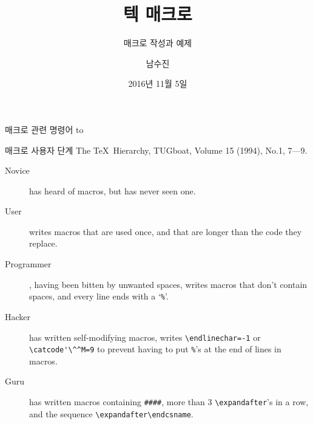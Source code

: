 \documentclass{beamer}
\title{텍 매크로}
\subtitle{매크로 작성과 예제}
\author{남수진}
\date{2016년 11월 5일}
\institute{
  2016 공주대학교 문서작성 워크숍 2016\\
  공주대학교 인문사회과학관 1층 컴퓨터실 107호}
\begin{document}
\maketitle



 
%
\begin{frame}{매크로 관련 명령어}
  \vspace{4mm}
  \hbox to
\end{frame}


%
\begin{frame}[fragile]{매크로 사용자 단계}
  The \TeX\ Hierarchy, TUGboat, Volume 15 (1994), No.1, 7---9.
  \begin{description}
  \item [Novice] has heard of macros, but has never seen one.
  \item [User] writes macros that are used once, and that are
    longer than the code they replace.
  \item [Programmer], having been bitten by unwanted spaces,
    writes macros that don't contain spaces, and every line ends with
    a `{\small\verb+%+}'.
  \item [Hacker] has written self-modifying macros, writes
    {\small\verb+\endlinechar=-1+} or {\small\verb+\catcode'\^^M=9+}
    to prevent having to put {\small\verb+%+}'s at the end of lines in macros.
  \item [Guru] has written macros containing {\small\verb+####+}, more than 3
    {\small\verb+\expandafter+}'s in a row, and the sequence
    {\small\verb+\expandafter\endcsname+}.
  \end{description}
\end{frame}
\end{document}
